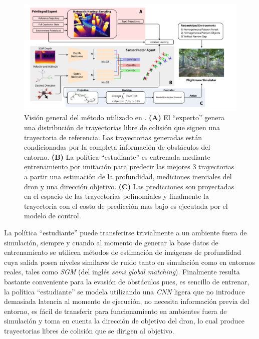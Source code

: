     \begin{figure}[H]
        \centering
        \includegraphics[scale=0.3]{partes/img/agile-autonomy-overview.png}
        \caption[Visión general del método del método utilizado en \textit{Learning high-speed flight in the wild}]{Visión general del método utilizado en \cite{Loquercio2021}. \textbf{(A)} El ``experto'' genera una distribución de trayectorias libre de colisión que siguen una trayectoria de referencia. Las trayectorias generadas están condicionadas por la completa información de obstáculos del entorno. \textbf{(B)} La política ``estudiante'' es entrenada mediante entrenamiento por imitación para predecir las mejores 3 trayectorias a partir una estimación de la profundidad, mediciones inerciales del dron y una dirección objetivo. \textbf{(C)} Las predicciones son proyectadas en el espacio de las trayectorias polinomiales y finalmente la trayectoria con el costo de predicción mas bajo es ejecutada por el modelo de control. }
        \label{fig:agile-autonomy-overview}
    \end{figure}
    
    La política ``estudiante'' puede transferirse trivialmente a un ambiente fuera de simulación, siempre y cuando al momento de generar la base datos de entrenamiento se utilicen métodos de estimación de imágenes de profundidad cuya salida posea niveles similares de ruido tanto en simulación como en entornos reales, tales como \textit{SGM} \cite{Hirschmüller2007} (del inglés \textit{semi global matching}). Finalmente  \cite{Loquercio2021} resulta bastante conveniente para la evasión de obstáculos pues, es sencillo de entrenar, la política ``estudiante'' se modela utilizando una \textit{CNN} ligera \cite{Howard2019} que no introduce demasiada latencia al momento de ejecución, no necesita información previa del entorno, es fácil de transferir para funcionamiento en ambientes fuera de simulación y toma en cuenta la dirección de objetivo del dron, lo cual produce trayectorias libres de colisión que se dirigen al objetivo.


